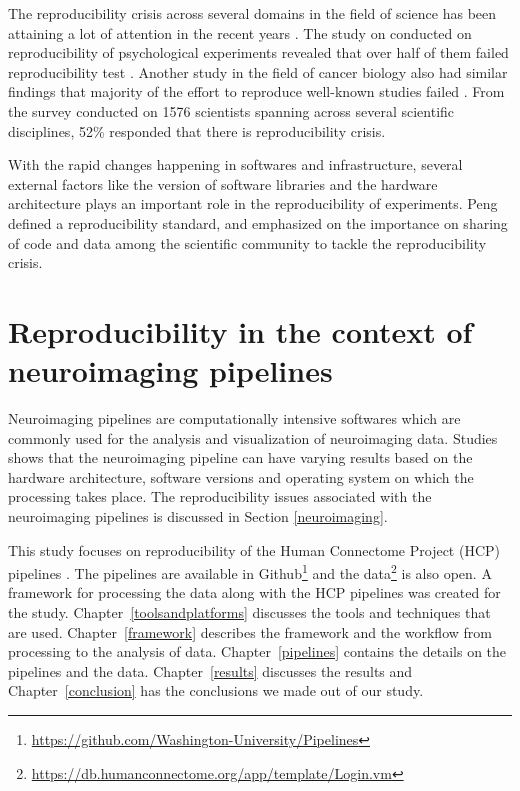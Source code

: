 The reproducibility crisis across several domains in the field of science has been attaining a lot of attention in the recent years \cite{aac4716,Begley2012,Button2013,Baker2016,Estimating-reproducibility,Gla15}. The study on conducted on reproducibility of psychological experiments revealed that over half of them failed reproducibility test \cite{aac4716}. Another study in the field of cancer biology also had similar findings that majority of the effort to reproduce well-known studies failed \cite{Begley2012}. From the survey conducted on 1576 scientists spanning across several scientific disciplines, 52\% responded that there is reproducibility crisis.

With the rapid changes happening in softwares and infrastructure, several external factors like the version of software libraries and the hardware architecture plays an important role in the reproducibility \cite{10.1371/journal.pone.0038234,Gla15} of experiments. Peng defined a reproducibility standard, and emphasized on the importance on sharing of code and data among the scientific community \cite{Peng2011} to tackle the reproducibility  crisis.

\section{Reproducibility in the context of neuroimaging pipelines}
Neuroimaging pipelines are computationally intensive softwares which are commonly used for the analysis and visualization of neuroimaging data. Studies~\cite{10.1371/journal.pone.0038234,Gla15} shows that the neuroimaging pipeline can have varying results based on the hardware architecture, software versions and operating system on which the processing takes place. The reproducibility issues associated with the neuroimaging pipelines is discussed in Section \ref{neuroimaging}.

This study focuses on reproducibility of the Human Connectome Project (HCP) pipelines \cite{Gla13}. The pipelines are available in Github\footnote{\url{https://github.com/Washington-University/Pipelines}} and the data\footnote{\url{https://db.humanconnectome.org/app/template/Login.vm}} is also open. A framework for processing the data along with the HCP pipelines was created for the study. Chapter~\ref{toolsandplatforms} discusses the tools and techniques that are used. Chapter~\ref{framework} describes the framework and the workflow from processing to the analysis of data. Chapter~\ref{pipelines} contains the details on the pipelines and the data. Chapter~\ref{results} discusses the results and Chapter~\ref{conclusion} has the conclusions we made out of our study.

